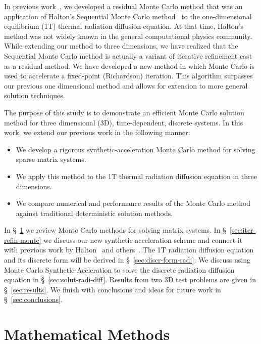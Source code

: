 \documentclass[preprint,12pt]{elsarticle}
\begin{document}
In previous work~\cite{evans_2003}, we developed a residual Monte
Carlo method that was an application of Halton's Sequential Monte
Carlo method~\cite{halton_1962,halton_1994} to the one-dimensional
equilibrium (1T) thermal radiation diffusion equation.  At that time,
Halton's method was not widely known in the general computational
physics community.  While extending our method to three dimensions, we
have realized that the Sequential Monte Carlo method is actually a
variant of iterative refinement cast as a residual method. We have
developed a new method in which Monte Carlo is used to accelerate a
fixed-point (Richardson) iteration. This algorithm surpasses our
previous one dimensional method and allows for extension to more
general solution techniques.

The purpose of this study is to demonstrate an efficient Monte Carlo
solution method for three dimensional (3D), time-dependent, discrete
systems. In this work, we extend our previous work in the following
manner:
\begin{itemize}
\item We develop a rigorous synthetic-acceleration Monte Carlo method
  for solving sparse matrix systems.
\item We apply this method to the 1T thermal radiation diffusion
  equation in three dimensions.
\item We compare numerical and performance results of the Monte Carlo
  method against traditional deterministic solution methods.
\end{itemize}

In \S~\ref{sec:monte-carlo-matrix} we review Monte Carlo methods for
solving matrix systems. In \S~\ref{sec:iter-refin-monte} we discuss
our new synthetic-acceleration scheme and connect it with previous
work by Halton~\cite{halton_1994} and others~\cite{evans_2003}.  The
1T radiation diffusion equation and its discrete form will be derived
in \S~\ref{sec:discr-form-radi}.  We discuss using Monte Carlo
Synthetic-Accleration to solve the discrete radiation diffusion
equation in \S~\ref{sec:solut-radi-diff}.  Results from two 3D test
problems are given in \S~\ref{sec:results}.  We finish with
conclusions and ideas for future work in \S~\ref{sec:conclusions}.

\section{Mathematical Methods}
\label{sec:monte-carlo-matrix}
\end{document}
